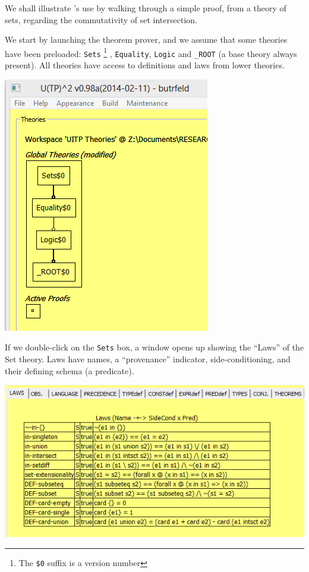 \documentclass[copyright]{eptcs}
\begin{document}
We shall illustrate 's use by walking through a simple proof,
from a theory of sets, regarding the commutativity of set intersection.

\noindent
We start by launching the theorem prover, and we assume that some theories have been
preloaded: \texttt{Sets}%
\footnote{The \texttt{\$0} suffix is a version number}%
, \texttt{Equality}, \texttt{Logic} and \texttt{\_ROOT} (a base theory always present).
All theories have access to definitions and laws from lower theories.


\includegraphics[scale=0.5]{01-initial-state.png}

\noindent
If we double-click on the \texttt{Sets} box,
a window opens up showing the ``Laws'' of the Set theory.
Laws have names, a ``provenance'' indicator, side-conditioning,
and their defining schema (a predicate).

\includegraphics[scale=0.5]{02-set-axioms.png}
\end{document}
